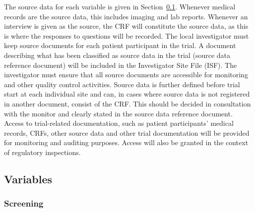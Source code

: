 \documentclass[
]{scrartcl}
\begin{document}
The source data for each variable is given in
Section~\ref{sec-variables}. Whenever medical records are the source
data, this includes imaging and lab reports. Whenever an interview is
given as the source, the CRF will constitute the source data, as this is
where the responses to questions will be recorded. The local
investigator must keep source documents for each patient participant in
the trial. A document describing what has been classified as source data
in the trial (source data reference document) will be included in the
Investigator Site File (ISF). The investigator must ensure that all
source documents are accessible for monitoring and other quality control
activities. Source data is further defined before trial start at each
individual site and can, in cases where source data is not registered in
another document, consist of the CRF. This should be decided in
consultation with the monitor and clearly stated in the source data
reference document. Access to trial-related documentation, such as
patient participants' medical records, CRFs, other source data and other
trial documentation will be provided for monitoring and auditing
purposes. Access will also be granted in the context of regulatory
inspections.

\hypertarget{sec-variables}{%
\subsection{Variables}\label{sec-variables}}

\hypertarget{screening-3}{%
\subsubsection{Screening}\label{screening-3}}
\end{document}
